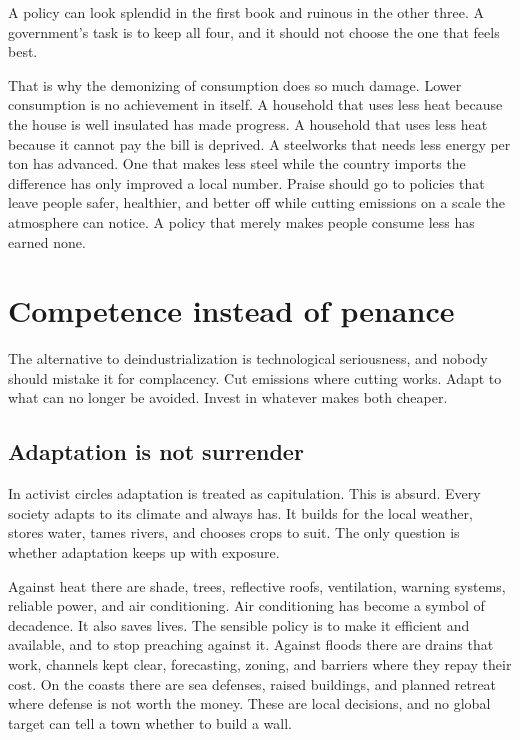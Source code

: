 \documentclass[12pt,a4paper]{book}
\begin{document}
A policy can look splendid in the first book and ruinous in the other three. A government's task is to keep all four, and it should not choose the one that feels best.

That is why the demonizing of consumption does so much damage. Lower consumption is no achievement in itself. A household that uses less heat because the house is well insulated has made progress. A household that uses less heat because it cannot pay the bill is deprived. A steelworks that needs less energy per ton has advanced. One that makes less steel while the country imports the difference has only improved a local number. Praise should go to policies that leave people safer, healthier, and better off while cutting emissions on a scale the atmosphere can notice. A policy that merely makes people consume less has earned none.

\section{Competence instead of penance}

The alternative to deindustrialization is technological seriousness, and nobody should mistake it for complacency. Cut emissions where cutting works. Adapt to what can no longer be avoided. Invest in whatever makes both cheaper.

\subsection{Adaptation is not surrender}

In activist circles adaptation is treated as capitulation. This is absurd. Every society adapts to its climate and always has. It builds for the local weather, stores water, tames rivers, and chooses crops to suit. The only question is whether adaptation keeps up with exposure.

Against heat there are shade, trees, reflective roofs, ventilation, warning systems, reliable power, and air conditioning. Air conditioning has become a symbol of decadence. It also saves lives. The sensible policy is to make it efficient and available, and to stop preaching against it. Against floods there are drains that work, channels kept clear, forecasting, zoning, and barriers where they repay their cost. On the coasts there are sea defenses, raised buildings, and planned retreat where defense is not worth the money. These are local decisions, and no global target can tell a town whether to build a wall.
\end{document}
